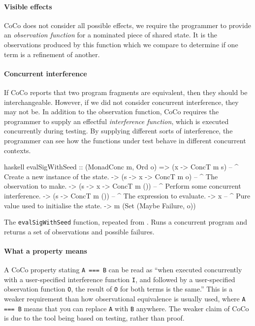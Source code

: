 \paragraph{Visible effects}
CoCo does not consider all possible effects, we require the programmer
to provide an \emph{observation function} for a nominated piece of
shared state.  It is the observations produced by this function which
we compare to determine if one term is a refinement of another.

\paragraph{Concurrent interference}
If CoCo reports that two program fragments are equivalent, then they
should be interchangeable.  However, if we did not consider concurrent
interference, they may not be.  In addition to the observation
function, CoCo requires the programmer to supply an effectful
\emph{interference function}, which is executed concurrently during
testing.  By supplying different sorts of interference, the programmer
can see how the functions under test behave in different concurrent
contexts.

\begin{listing}
\centering
\begin{cminted}{haskell}
evalSigWithSeed :: (MonadConc m, Ord o)
  => (x -> ConcT m s)       -- ^ Create a new instance of the state.
  -> (s -> x -> ConcT m o)  -- ^ The observation to make.
  -> (s -> x -> ConcT m ()) -- ^ Perform some concurrent interference.
  -> (s -> ConcT m ())      -- ^ The expression to evaluate.
  -> x                      -- ^ Pure value used to initialise the state.
  -> m (Set (Maybe Failure, o))
\end{cminted}
\caption[The \texttt{evalSigWithSeed} function, repeated from .]{The \texttt{evalSigWithSeed} function, repeated from .  Runs a concurrent program and returns a set of observations and possible failures.}\label{lst:coco-evalSigWithSeed}
\end{listing}

\paragraph{What a property means}
A CoCo property stating \verb|A === B| can be read as ``when executed
concurrently with a user-specified interference function \verb|I|, and
followed by a user-specified observation function \verb|O|, the result
of \verb|O| for both terms is the same.''  This is a weaker
requirement than how observational equivalence is usually used, where
\verb|A === B| means that you can replace \verb|A| with \verb|B|
anywhere.  The weaker claim of CoCo is due to the tool being based on
testing, rather than proof.

